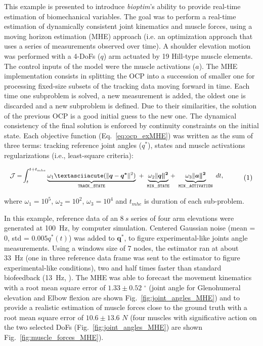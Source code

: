 This example is presented to introduce \textit{bioptim}'s ability to provide real-time estimation of biomechanical variables.
The goal was to perform a real-time estimation of dynamically consistent joint kinematics and muscle forces, using a moving horizon estimation (MHE) approach (i.e. an optimization approach that uses a series of measurements observed over time). 
A shoulder elevation motion was performed with a 4-DoFs ($q$) arm actuated by 19 Hill-type muscle elements.
The control inputs of the model were the muscle activations ($a$).
The MHE implementation consists in splitting the OCP into a succession of smaller one for processing fixed-size subsets of the tracking data moving forward in time. 
Each time one subproblem is solved, a new measurement is added, the oldest one is discarded and a new subproblem is defined. 
Due to their similarities, the solution of the previous OCP is a good initial guess to the new one. 
The dynamical consistency of the final solution is enforced by continuity constraints on the initial state. 
Each objective function (Eq.~\ref{eq:ocp_exMHE}) was written as the sum of three terms: tracking reference joint angles ($q^*$), states and muscle activations regularizations (i.e., least-square criteria): 

\[ 
\resizebox{0.9\columnwidth}{!}{$ 
\begin{aligned}
\mathcal{J} = &\int_t^{t+t_{mhe}}\underbrace{\omega_1´(\|\boldsymbol{q} - \boldsymbol{q^*}\|^{2})}_{\mathtt{TRACK\_STATE}}~ 
+ ~ \underbrace{\omega_2\|\boldsymbol{q\|^2}}_{\mathtt{MIN\_STATE}} 
+ ~ \underbrace{\omega_3\|\boldsymbol{a\|^2}}_{\mathtt{MIN\_ACTIVATION}}~dt, 
\end{aligned}   
$}  
\addtag  
\label{eq:ocp_exMHE}  
\]  

\noindent where $\omega_1 =10^5$, $\omega_2 = 10^2$, $\omega_3 = 10^4$ and $t_{mhe}$ is duration of each sub-problem. 

In this example, reference data of an $8~s$ series of four arm elevations were generated at 100~Hz, by computer simulation.
Centered Gaussian noise (mean = 0, std = $0.005q^*(t)$) was added to $\boldsymbol{q^*}$, to figure experimental-like joints angle measurements.
Using a windows size of 7 nodes, the estimator ran at about 33~Hz (one in three reference data frame was sent to the estimator to figure experimental-like conditions), two and half times faster than standard biofeedback (13~Hz, \cite{kannape2013biofeedback}).
The MHE was able to forecast the movement kinematics with a root mean square error of $1.33\pm0.52\text{~}^{\circ}$ (joint angle for Glenohumeral elevation and Elbow flexion are shown Fig.~\ref{fig:joint_angles_MHE}) and to provide a realistic estimation of muscle forces close to the ground truth with a root mean square error of $10.6\pm13.6\text{~}N$ (four muscles with significative action on the two selected DoFs (Fig.~\ref{fig:joint_angles_MHE}) are shown Fig.~\ref{fig:muscle_forces_MHE}).

